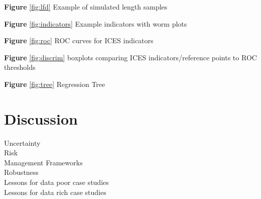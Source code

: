\documentclass[12pt,doublespacing,a4paper]{ouparticle}
\begin{document}
\textbf{Figure} \ref{fig:lfd} Example of simulated length samples 

\textbf{Figure} \ref{fig:indicators} Example indicators with worm plots

\textbf{Figure} \ref{fig:roc} ROC curves for ICES indicators

\textbf{Figure} \ref{fig:discrim} boxplots comparing ICES indicators/reference points to ROC thresholds

\textbf{Figure} \ref{fig:tree} Regression Tree


\section{Discussion}


\begin{description}
 \item[Uncertainty]  
 \item[Risk]     
 \item[Management Frameworks] 
 \item[Robustness]
 \item[Lessons for data poor case studies]  
 \item[Lessons for data rich case studies] 
\end{description}


\end{document}

